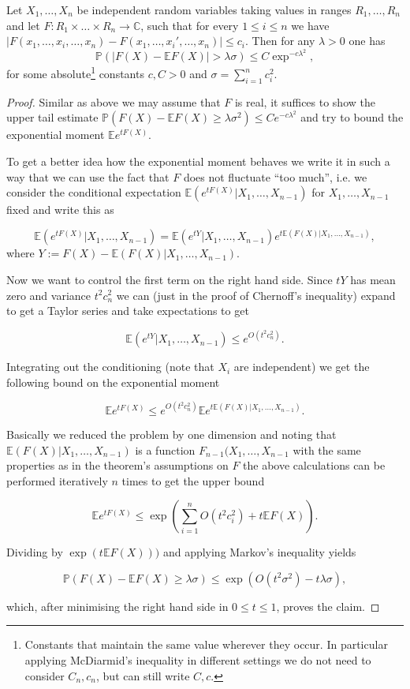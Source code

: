 \begin{theorem}
	Let $X_1,\dots,X_n$ be independent random variables taking values in ranges $R_1,\dots,R_n$ and let $F:R_1\times\dots\times R_n\rightarrow\mathbb C$, such that for every $1\leq i\leq n$ we have $|F(x_1,\dots,x_i,\dots,x_n)-F(x_1,\dots,x_i',\dots,x_n)|\leq c_i$. Then for any $\lambda>0$ one has $$\mathbb P(|F(X)-\mathbb EF(X)|>\lambda\sigma)\leq C\exp^{-c\lambda^2},$$ for some absolute\footnote{Constants that maintain the same value wherever they occur. In particular applying McDiarmid's inequality in different settings we do not need to consider $C_n, c_n$, but can still write $C,c$.} constants $c,C>0$ and $\sigma=\sum_{i=1}^n c_i^2$.
\end{theorem}

\begin{proof}
	Similar as above we may assume that $F$ is real, it suffices to show the upper tail estimate $\mathbb P(F(X)-\mathbb EF(X)\geq\lambda\sigma^2)\leq Ce^{-c\lambda^2}$ and try to bound the exponential moment $\mathbb Ee^{tF(X)}$.
	
	To get a better idea how the exponential moment behaves we write it in such a way that we can use the fact that $F$ does not fluctuate ``too much'', i.e. we consider the conditional expectation $\mathbb E(e^{tF(X)}|X_1,\dots,X_{n-1})$ for $X_1,\dots,X_{n-1}$ fixed and write this as
	
	$$\mathbb E(e^{tF(X)}|X_1,\dots,X_{n-1}) = \mathbb E(e^{tY}|X_1,\dots,X_{n-1})e^{t\mathbb E(F(X)|X_1,\dots,X_{n-1})},$$
	where $Y:=F(X)-\mathbb E(F(X)|X_1,\dots,X_{n-1})$.
	
	Now we want to control the first term on the right hand side.
	Since $tY$ has mean zero and variance $t^2c_n^2$ we can (just in the proof of Chernoff's inequality) expand to get a Taylor series and take expectations to get
	
	$$\mathbb E(e^{tY}|X_1,\dots,X_{n-1}) \leq e^{O(t^2c_n^2)}.$$
	
	Integrating out the conditioning (note that $X_i$ are independent) we get the following bound on the exponential moment
	
	$$\mathbb Ee^{tF(X)} \leq e^{O(t^2c_n^2)}\mathbb E e^{t\mathbb E(F(X)|X_1,\dots,X_{n-1})}.$$
	
	Basically we reduced the problem by one dimension and noting that $\mathbb E(F(X)|X_1,\dots,X_{n-1})$ is a function $F_{n-1}(X_1,\dots,X_{n-1}$ with the same properties as in the theorem's assumptions on $F$ the above calculations can be performed iteratively $n$ times to get the upper bound
	
	$$\mathbb Ee^{tF(X)}\leq \exp(\sum_{i=1}^n O(t^2c_i^2) + t\mathbb EF(X)).$$
	
	Dividing by $\exp(t\mathbb EF(X)))$ and applying Markov's inequality yields
	
	$$\mathbb P(F(X)-\mathbb EF(X)\geq\lambda\sigma) \leq \exp(O(t^2\sigma^2)-t\lambda\sigma),$$
	
	which, after minimising the right hand side in $0\leq t\leq 1$, proves the claim.
\end{proof}


